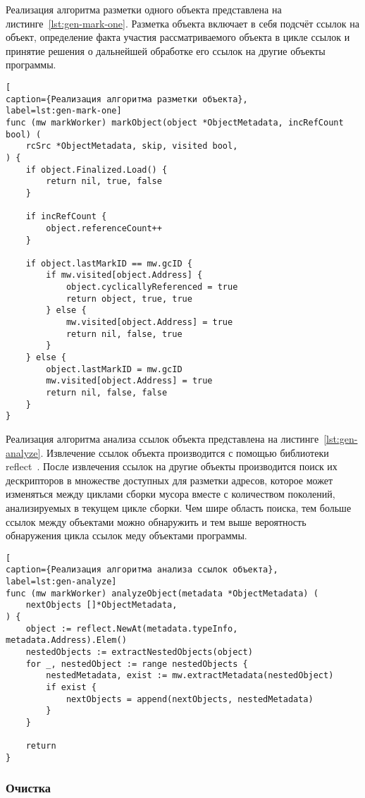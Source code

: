 Реализация алгоритма разметки одного объекта представлена на листинге~\ref{lst:gen-mark-one}. Разметка объекта включает в себя подсчёт ссылок на объект, определение факта участия рассматриваемого объекта в цикле ссылок и принятие решения о дальнейшей обработке его ссылок на другие объекты программы.

\clearpage
\begin{lstlisting}[
caption={Реализация алгоритма разметки объекта},
label=lst:gen-mark-one]
func (mw markWorker) markObject(object *ObjectMetadata, incRefCount bool) (
	rcSrc *ObjectMetadata, skip, visited bool,
) {
	if object.Finalized.Load() {
		return nil, true, false
	}
	
	if incRefCount {
		object.referenceCount++
	}
	
	if object.lastMarkID == mw.gcID {
		if mw.visited[object.Address] {
			object.cyclicallyReferenced = true
			return object, true, true
		} else {
			mw.visited[object.Address] = true
			return nil, false, true
		}
	} else {
		object.lastMarkID = mw.gcID
		mw.visited[object.Address] = true
		return nil, false, false
	}
}
\end{lstlisting}

Реализация алгоритма анализа ссылок объекта представлена на листинге~\ref{lst:gen-analyze}. Извлечение ссылок объекта производится с помощью библиотеки reflect~\cite{golang_reflect}. После извлечения ссылок на другие объекты производится поиск их дескрипторов в множестве доступных для разметки адресов, которое может изменяться между циклами сборки мусора вместе с количеством поколений, анализируемых в текущем цикле сборки. Чем шире область поиска, тем больше ссылок между объектами можно обнаружить и тем выше вероятность обнаружения цикла ссылок меду объектами программы.

\clearpage
\begin{lstlisting}[
caption={Реализация алгоритма анализа ссылок объекта},
label=lst:gen-analyze]
func (mw markWorker) analyzeObject(metadata *ObjectMetadata) (
	nextObjects []*ObjectMetadata,
) {
	object := reflect.NewAt(metadata.typeInfo, metadata.Address).Elem()
	nestedObjects := extractNestedObjects(object)
	for _, nestedObject := range nestedObjects {
		nestedMetadata, exist := mw.extractMetadata(nestedObject)
		if exist {
			nextObjects = append(nextObjects, nestedMetadata)
		}
	}
	
	return
}
\end{lstlisting}



\subsubsection{Очистка}


